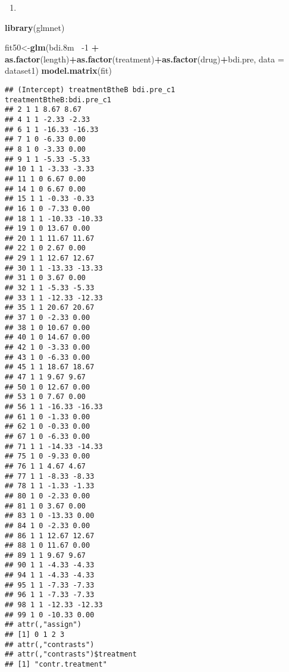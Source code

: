 \documentclass[
]{article}
\newenvironment{Shaded}{\begin{snugshade}}{\end{snugshade}}
\newcommand{\DataTypeTok}[1]{\textcolor[rgb]{0.13,0.29,0.53}{#1}}
\newcommand{\DecValTok}[1]{\textcolor[rgb]{0.00,0.00,0.81}{#1}}
\newcommand{\FloatTok}[1]{\textcolor[rgb]{0.00,0.00,0.81}{#1}}
\newcommand{\KeywordTok}[1]{\textcolor[rgb]{0.13,0.29,0.53}{\textbf{#1}}}
\newcommand{\NormalTok}[1]{#1}
\newcommand{\OperatorTok}[1]{\textcolor[rgb]{0.81,0.36,0.00}{\textbf{#1}}}
\newcommand{\StringTok}[1]{\textcolor[rgb]{0.31,0.60,0.02}{#1}}
\begin{document}
\begin{enumerate}
\def\labelenumi{\arabic{enumi})}
\setcounter{enumi}{5}
\item
\end{enumerate}

\begin{Shaded}
\begin{Highlighting}[]
\KeywordTok{library}\NormalTok{(glmnet)}



\NormalTok{fit50<-}\KeywordTok{glm}\NormalTok{(bdi}\FloatTok{.8}\NormalTok{m}\OperatorTok{~}\StringTok{ }\DecValTok{-1} \OperatorTok{+}\StringTok{ }\KeywordTok{as.factor}\NormalTok{(length)}\OperatorTok{+}\KeywordTok{as.factor}\NormalTok{(treatment)}\OperatorTok{+}\KeywordTok{as.factor}\NormalTok{(drug)}\OperatorTok{+}\NormalTok{bdi.pre, }\DataTypeTok{data =}\NormalTok{ dataset1)}
\KeywordTok{model.matrix}\NormalTok{(fit)}
\end{Highlighting}
\end{Shaded}

\begin{verbatim}
## (Intercept) treatmentBtheB bdi.pre_c1
treatmentBtheB:bdi.pre_c1
## 2 1 1 8.67 8.67
## 4 1 1 -2.33 -2.33
## 6 1 1 -16.33 -16.33
## 7 1 0 -6.33 0.00
## 8 1 0 -3.33 0.00
## 9 1 1 -5.33 -5.33
## 10 1 1 -3.33 -3.33
## 11 1 0 6.67 0.00
## 14 1 0 6.67 0.00
## 15 1 1 -0.33 -0.33
## 16 1 0 -7.33 0.00
## 18 1 1 -10.33 -10.33
## 19 1 0 13.67 0.00
## 20 1 1 11.67 11.67
## 22 1 0 2.67 0.00
## 29 1 1 12.67 12.67
## 30 1 1 -13.33 -13.33
## 31 1 0 3.67 0.00
## 32 1 1 -5.33 -5.33
## 33 1 1 -12.33 -12.33
## 35 1 1 20.67 20.67
## 37 1 0 -2.33 0.00
## 38 1 0 10.67 0.00
## 40 1 0 14.67 0.00
## 42 1 0 -3.33 0.00
## 43 1 0 -6.33 0.00
## 45 1 1 18.67 18.67
## 47 1 1 9.67 9.67
## 50 1 0 12.67 0.00
## 53 1 0 7.67 0.00
## 56 1 1 -16.33 -16.33
## 61 1 0 -1.33 0.00
## 62 1 0 -0.33 0.00
## 67 1 0 -6.33 0.00
## 71 1 1 -14.33 -14.33
## 75 1 0 -9.33 0.00
## 76 1 1 4.67 4.67
## 77 1 1 -8.33 -8.33
## 78 1 1 -1.33 -1.33
## 80 1 0 -2.33 0.00
## 81 1 0 3.67 0.00
## 83 1 0 -13.33 0.00
## 84 1 0 -2.33 0.00
## 86 1 1 12.67 12.67
## 88 1 0 11.67 0.00
## 89 1 1 9.67 9.67
## 90 1 1 -4.33 -4.33
## 94 1 1 -4.33 -4.33
## 95 1 1 -7.33 -7.33
## 96 1 1 -7.33 -7.33
## 98 1 1 -12.33 -12.33
## 99 1 0 -10.33 0.00
## attr(,"assign")
## [1] 0 1 2 3
## attr(,"contrasts")
## attr(,"contrasts")$treatment
## [1] "contr.treatment"
\end{verbatim}
\end{document}
